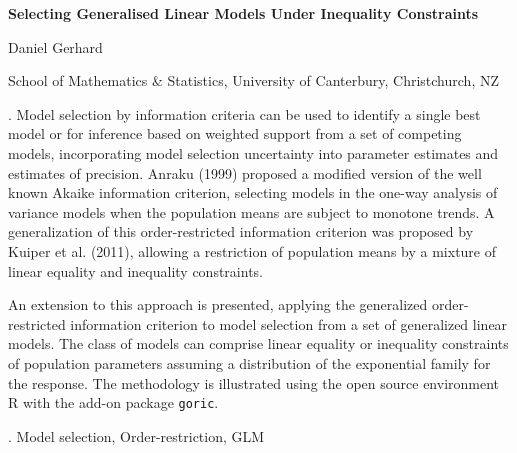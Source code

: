 \documentclass[12pt]{article}
\begin{document}
\begin{flushleft}


{\LARGE\bf Selecting Generalised Linear Models Under Inequality Constraints}


\vspace{1.0cm}

Daniel Gerhard

\begin{description}

\item School of Mathematics \& Statistics, University of Canterbury, Christchurch, NZ

\end{description}

\end{flushleft}


\vspace{0.75cm}

. Model selection by information criteria can be used to identify a single best model or for inference based on weighted support from a set of competing models, incorporating model selection uncertainty into parameter estimates and estimates of precision. Anraku (1999) proposed a modified version of the well known Akaike information criterion, selecting models in the one-way analysis of variance models when the population means are subject to monotone trends. A generalization of this order-restricted information criterion was proposed by Kuiper et al. (2011), allowing a restriction of population means by a mixture of linear equality and inequality constraints.

An extension to this approach is presented, applying the generalized order-restricted information criterion to model selection from a set of generalized linear models. The class of models can comprise linear equality or inequality constraints of population parameters assuming a distribution of the exponential family for the response. The methodology is illustrated using the open source environment R with the add-on package \texttt{goric}.


\vskip 2mm

.
Model selection, Order-restriction, GLM
\end{document}
